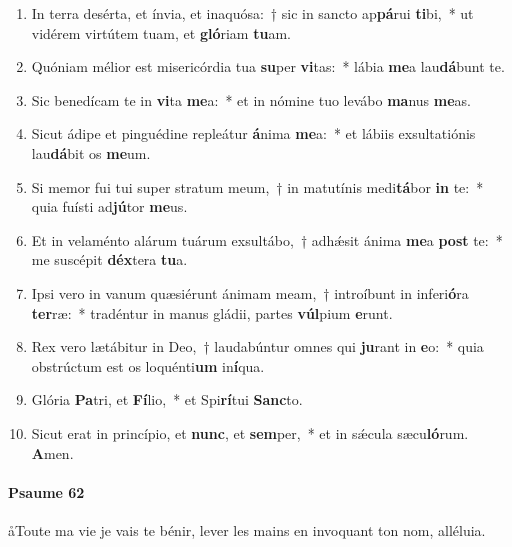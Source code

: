 \documentclass[twoside]{article}
\begin{document}
\begin{paracol}[1]{2}
\begin{enumerate}[wide, itemsep=0mm, labelwidth=!, labelindent=0pt, label=\color{gregoriocolor}\theenumi]
\item In terra desérta, et ínvia, et inaquósa:~† sic in sancto ap\textbf{pá}rui \textbf{ti}bi,~* ut vidérem virtútem tuam, et \textbf{gló}riam \textbf{tu}am.

\item Quóniam mélior est misericórdia tua \textbf{su}per \textbf{vi}tas:~* lábia \textbf{me}a lau\textbf{dá}bunt te.

\item Sic benedícam te in \textbf{vi}ta \textbf{me}a:~* et in nómine tuo levábo \textbf{ma}nus \textbf{me}as.

\item Sicut ádipe et pinguédine repleátur \textbf{á}nima \textbf{me}a:~* et lábiis exsultatiónis lau\textbf{dá}bit os \textbf{me}um.

\item Si memor fui tui super stratum meum,~† in matutínis medi\textbf{tá}bor \textbf{in} te:~* quia fuísti ad\textbf{jú}tor \textbf{me}us.

\item Et in velaménto alárum tuárum exsultábo,~† adhǽsit ánima \textbf{me}a \textbf{post} te:~* me suscépit \textbf{déx}tera \textbf{tu}a.

\item Ipsi vero in vanum quæsiérunt ánimam meam,~† introíbunt in inferi\textbf{ó}ra \textbf{ter}ræ:~* tradéntur in manus gládii, partes \textbf{vúl}pium \textbf{e}runt.

\item Rex vero lætábitur in Deo,~† laudabúntur omnes qui \textbf{ju}rant in \textbf{e}o:~* quia obstrúctum est os loquénti\textbf{um} in\textbf{í}qua.

\item Glória \textbf{Pa}tri, et \textbf{Fí}lio,~* et Spi\textbf{rí}tui \textbf{Sanc}to.

\item Sicut erat in princípio, et \textbf{nunc}, et \textbf{sem}per,~* et in sǽcula sæcu\textbf{ló}rum. \textbf{A}men.
\end{enumerate}

\switchcolumn

\paragraph{Psaume 62}

\aa Toute ma vie je vais te bénir,
lever les mains en invoquant ton nom, alléluia.



\end{paracol}
\end{document}
